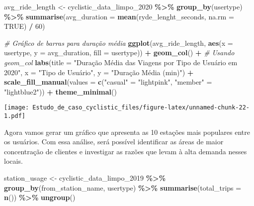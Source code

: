 \documentclass[
]{article}
\newenvironment{Shaded}{\begin{snugshade}}{\end{snugshade}}
\newcommand{\AttributeTok}[1]{\textcolor[rgb]{0.13,0.29,0.53}{#1}}
\newcommand{\CommentTok}[1]{\textcolor[rgb]{0.56,0.35,0.01}{\textit{#1}}}
\newcommand{\ConstantTok}[1]{\textcolor[rgb]{0.56,0.35,0.01}{#1}}
\newcommand{\DecValTok}[1]{\textcolor[rgb]{0.00,0.00,0.81}{#1}}
\newcommand{\FunctionTok}[1]{\textcolor[rgb]{0.13,0.29,0.53}{\textbf{#1}}}
\newcommand{\NormalTok}[1]{#1}
\newcommand{\OtherTok}[1]{\textcolor[rgb]{0.56,0.35,0.01}{#1}}
\newcommand{\SpecialCharTok}[1]{\textcolor[rgb]{0.81,0.36,0.00}{\textbf{#1}}}
\newcommand{\StringTok}[1]{\textcolor[rgb]{0.31,0.60,0.02}{#1}}
\begin{document}
\begin{Shaded}
\begin{Highlighting}[]
\NormalTok{avg\_ride\_length }\OtherTok{\textless{}{-}}\NormalTok{ cyclistic\_data\_limpo\_2020 }\SpecialCharTok{\%\textgreater{}\%}
  \FunctionTok{group\_by}\NormalTok{(usertype) }\SpecialCharTok{\%\textgreater{}\%}
  \FunctionTok{summarise}\NormalTok{(}\AttributeTok{avg\_duration =} \FunctionTok{mean}\NormalTok{(ryde\_lenght\_seconds, }\AttributeTok{na.rm =} \ConstantTok{TRUE}\NormalTok{) }\SpecialCharTok{/} \DecValTok{60}\NormalTok{)}

\CommentTok{\# Gráfico de barras para duração média}
\FunctionTok{ggplot}\NormalTok{(avg\_ride\_length, }\FunctionTok{aes}\NormalTok{(}\AttributeTok{x =}\NormalTok{ usertype, }\AttributeTok{y =}\NormalTok{ avg\_duration, }\AttributeTok{fill =}\NormalTok{ usertype)) }\SpecialCharTok{+}
  \FunctionTok{geom\_col}\NormalTok{() }\SpecialCharTok{+}  \CommentTok{\# Usando geom\_col}
  \FunctionTok{labs}\NormalTok{(}\AttributeTok{title =} \StringTok{"Duração Média das Viagens por Tipo de Usuário em 2020"}\NormalTok{, }
       \AttributeTok{x =} \StringTok{"Tipo de Usuário"}\NormalTok{, }
       \AttributeTok{y =} \StringTok{"Duração Média (min)"}\NormalTok{) }\SpecialCharTok{+}
  \FunctionTok{scale\_fill\_manual}\NormalTok{(}\AttributeTok{values =} \FunctionTok{c}\NormalTok{(}\StringTok{"casual"} \OtherTok{=} \StringTok{"lightpink"}\NormalTok{, }\StringTok{"member"} \OtherTok{=} \StringTok{"lightblue2"}\NormalTok{)) }\SpecialCharTok{+}
  \FunctionTok{theme\_minimal}\NormalTok{()}
\end{Highlighting}
\end{Shaded}

\texttt{[image: Estudo\_de\_caso\_cyclistic\_files/figure-latex/unnamed-chunk-22-1.pdf]}

Agora vamos gerar um gráfico que apresenta as 10 estações mais populares
entre os usuários. Com essa análise, será possível identificar as áreas
de maior concentração de clientes e investigar as razões que levam à
alta demanda nesses locais.

\begin{Shaded}
\begin{Highlighting}[]
\NormalTok{station\_usage }\OtherTok{\textless{}{-}}\NormalTok{ cyclistic\_data\_limpo\_2019 }\SpecialCharTok{\%\textgreater{}\%}
  \FunctionTok{group\_by}\NormalTok{(from\_station\_name, usertype) }\SpecialCharTok{\%\textgreater{}\%}
  \FunctionTok{summarise}\NormalTok{(}\AttributeTok{total\_trips =} \FunctionTok{n}\NormalTok{()) }\SpecialCharTok{\%\textgreater{}\%}
  \FunctionTok{ungroup}\NormalTok{()}
\end{Highlighting}
\end{Shaded}
\end{document}

